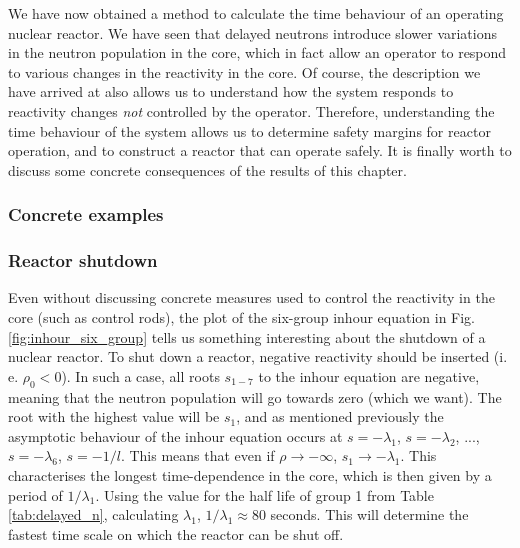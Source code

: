 We have now obtained a method to calculate the time behaviour of an operating nuclear reactor. We have seen that delayed neutrons introduce slower variations in the neutron population in the core, which in fact allow an operator to respond to various changes in the reactivity in the core. Of course, the description we have arrived at also allows us to understand how the system responds to reactivity changes \emph{not} controlled by the operator. Therefore, understanding the time behaviour of the system allows us to determine safety margins for reactor operation, and to construct a reactor that can operate safely. It is finally worth to discuss some concrete consequences of the results of this chapter.

\subsubsection{Concrete examples}
\subsubsection*{Reactor shutdown}
Even without discussing concrete measures used to control the reactivity in the core (such as control rods), the plot of the six-group inhour equation in Fig. \ref{fig:inhour_six_group} tells us something interesting about the shutdown of a nuclear reactor. To shut down a reactor, negative reactivity should be inserted (i. e. $\rho_0 < 0$). In such a case, all roots $s_{1-7}$ to the inhour equation are negative, meaning that the neutron population will go towards zero (which we want). The root with the highest value will be $s_1$, and as mentioned previously the asymptotic behaviour of the inhour equation occurs at $s = -\lambda_1$, $s = -\lambda_2$, ..., $s = -\lambda_6$, $s = -1/l$. This means that even if $\rho \rightarrow -\infty$, $s_1 \rightarrow -\lambda_1$. This characterises the longest time-dependence in the core, which is then given by a period of $1/\lambda_1$. Using the value for the half life of group 1 from Table \ref{tab:delayed_n}, calculating $\lambda_1$, $1/\lambda_1 \approx 80$ seconds. This will determine the fastest time scale on which the reactor can be shut off.

